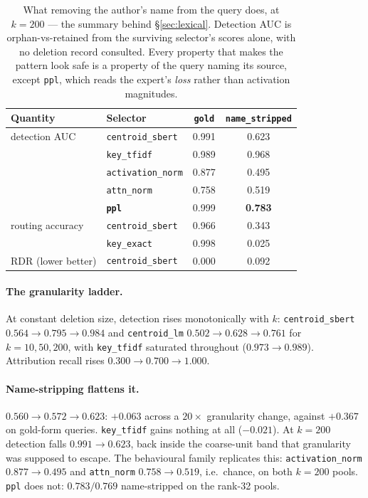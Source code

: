 \documentclass{article}
\newcommand{\rdr}{RDR}
\begin{document}
\begin{table}[ht]
  \caption{What removing the author's name from the query does, at $k=200$ --- the summary behind
  \S\ref{sec:lexical}. Detection AUC is orphan-vs-retained from the surviving selector's scores
  alone, with no deletion record consulted. Every property that makes the pattern look safe is a
  property of the query naming its source, except \texttt{ppl}, which reads the expert's
  \emph{loss} rather than activation magnitudes.}
  \label{tab:lexical}
  \centering
  \small
  \begin{tabular}{@{}llcc@{}}
    \toprule
    Quantity & Selector & \texttt{gold} & \texttt{name\_stripped} \\
    \midrule
    detection AUC         & \texttt{centroid\_sbert}  & 0.991 & 0.623 \\
                          & \texttt{key\_tfidf}       & 0.989 & 0.968 \\
                          & \texttt{activation\_norm} & 0.877 & 0.495 \\
                          & \texttt{attn\_norm}       & 0.758 & 0.519 \\
                          & \textbf{\texttt{ppl}}     & 0.999 & \textbf{0.783} \\
    routing accuracy      & \texttt{centroid\_sbert}  & 0.966 & 0.343 \\
                          & \texttt{key\_exact}       & 0.998 & 0.025 \\
    \rdr{} (lower better) & \texttt{centroid\_sbert}  & 0.000 & 0.092 \\
    \bottomrule
  \end{tabular}
\end{table}

\paragraph{The granularity ladder.} At constant deletion size, detection rises monotonically with
$k$: \texttt{centroid\_sbert} $0.564 \to 0.795 \to 0.984$ and \texttt{centroid\_lm} $0.502 \to
0.628 \to 0.761$ for $k=10,50,200$, with \texttt{key\_tfidf} saturated throughout ($0.973 \to
0.989$). Attribution recall rises $0.300 \to 0.700 \to 1.000$.

\paragraph{Name-stripping flattens it.} $0.560 \to 0.572 \to 0.623$: $+0.063$ across a $20\times$
granularity change, against $+0.367$ on gold-form queries. \texttt{key\_tfidf} gains nothing at all
($-0.021$). At $k=200$ detection falls $0.991 \to 0.623$, back inside the coarse-unit band that
granularity was supposed to escape. The behavioural family replicates this:
\texttt{activation\_norm} $0.877 \to 0.495$ and \texttt{attn\_norm} $0.758 \to 0.519$, i.e.\
chance, on both $k=200$ pools. \texttt{ppl} does not: $0.783/0.769$ name-stripped on the rank-32
pools.
\end{document}
